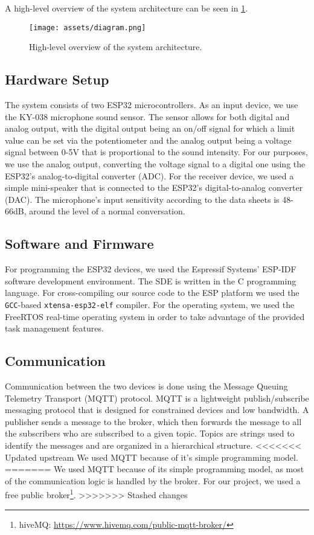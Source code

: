\documentclass[conference]{IEEEtran}
\begin{document}
A high-level overview of the system architecture can be seen in \cref{fig:architecture}.

\begin{figure}[h]
    \hspace*{-0.4cm}
    \texttt{[image: assets/diagram.png]}
    \vspace{-1.5cm}
    \caption{High-level overview of the system architecture.}
    \label{fig:architecture}
\end{figure}

\subsection{Hardware Setup}
The system consists of two ESP32\cite{ESP32_Manual} microcontrollers.
As an input device, we use the KY-038\cite{KY-038} microphone sound sensor.
The sensor allows for both digital and analog output, with the digital output being an
on/off signal for which a limit value can be set via the potentiometer and the analog output being a voltage signal between 0-5V that is proportional to the sound intensity.
For our purposes, we use the analog output, converting the voltage signal to a digital one using the
ESP32's analog-to-digital converter (ADC).
For the receiver device, we used a simple mini-speaker that is connected to the ESP32's digital-to-analog converter (DAC).
The microphone's input sensitivity according to the data sheets is 48-66dB, around the level of a normal conversation.

\subsection{Software and Firmware}

For programming the ESP32 devices, we used the Espressif Systems' ESP-IDF\cite{ESP-IDF}
software development environment. The SDE is written in the C programming 
language. For cross-compiling our source code to the ESP platform we used the \texttt{GCC}-based
\texttt{xtensa-esp32-elf} compiler. 
For the operating system, we used the FreeRTOS\cite{FreeRTOS} real-time operating system
in order to take advantage of the provided task management features.
\subsection{Communication}

Communication between the two devices is done using the Message Queuing Telemetry Transport (MQTT) protocol\cite{MQTT_Survey}.
MQTT is a lightweight publish/subscribe messaging protocol that is designed for constrained devices and low bandwidth.
A publisher sends a message to the broker, which then forwards the message to all the subscribers who are subscribed to a given topic.
Topics are strings used to identify the messages and are organized in a hierarchical structure.
<<<<<<< Updated upstream
We used MQTT because of it's simple programming model.
=======
We used MQTT because of its simple programming model, as most of the communication logic is handled by the broker.
For our project, we used a free public broker\footnote{hiveMQ: \url{https://www.hivemq.com/public-mqtt-broker/}}.
>>>>>>> Stashed changes
\end{document}

